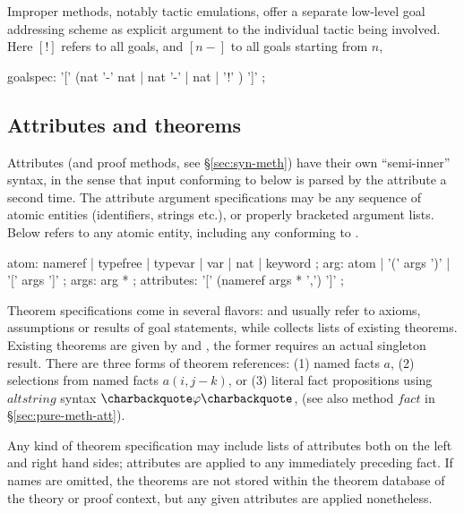 Improper methods, notably tactic emulations, offer a separate
low-level goal addressing scheme as explicit argument to the
individual tactic being involved.  Here $[!]$ refers to all goals, and
$[n-]$ to all goals starting from $n$,

\begin{rail}
  goalspec: '[' (nat '-' nat | nat '-' | nat | '!' ) ']'
  ;
\end{rail}


\subsection{Attributes and theorems}\label{sec:syn-att}

Attributes (and proof methods, see \S\ref{sec:syn-meth}) have their own
``semi-inner'' syntax, in the sense that input conforming to
 below is parsed by the attribute a second time.  The
attribute argument specifications may be any sequence of atomic entities
(identifiers, strings etc.), or properly bracketed argument lists.  Below
 refers to any atomic entity, including any 
conforming to .

\begin{rail}
  atom: nameref | typefree | typevar | var | nat | keyword
  ;
  arg: atom | '(' args ')' | '[' args ']'
  ;
  args: arg *
  ;
  attributes: '[' (nameref args * ',') ']'
  ;
\end{rail}

Theorem specifications come in several flavors: 
and  usually refer to axioms, assumptions or
results of goal statements, while  collects lists
of existing theorems.  Existing theorems are given by
 and , the former requires an
actual singleton result.  There are three forms of theorem references:
(1) named facts $a$, (2) selections from named facts $a(i, j - k)$, or
(3) literal fact propositions using $altstring$ syntax
$\backquote\phi\backquote$, (see also method $fact$ in
\S\ref{sec:pure-meth-att}).

Any kind of theorem specification may include lists of attributes both
on the left and right hand sides; attributes are applied to any
immediately preceding fact.  If names are omitted, the theorems are
not stored within the theorem database of the theory or proof context,
but any given attributes are applied nonetheless.


